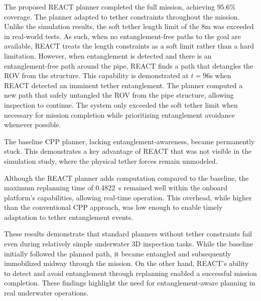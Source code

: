 The proposed \ac{REACT} planner completed the full mission, achieving $95.6\%$ coverage. The planner adapted to tether constraints throughout the mission. Unlike the simulation results, the soft tether length limit of the $8$m was exceeded in real-world tests. As such, when no entanglement-free paths to the goal are available, \ac{REACT} treats the length constraints as a soft limit rather than a hard limitation. However, when entanglement is detected and there is an entanglement-free path around the pipe, \ac{REACT} finds a path that detangles the \ac{ROV} from the structure. This capability is demonstrated at $t = 96$s when \ac{REACT} detected an imminent tether entanglement. The planner computed a new path that safely untangled the \ac{ROV} from the pipe structure, allowing inspection to continue. The system only exceeded the soft tether limit when necessary for mission completion while prioritizing entanglement avoidance whenever possible.

The baseline \ac{CPP} planner, lacking entanglement-awareness, became permanently stuck. This demonstrates a key advantage of \ac{REACT} that was not visible in the simulation study, where the physical tether forces remain unmodeled.


Although the \ac{REACT} planner adds computation compared to the baseline, the maximum replanning time of 0.4822~s remained well within the onboard platform’s capabilities, allowing real-time operation. This overhead, while higher than the conventional \ac{CPP} approach, was low enough to enable timely adaptation to tether entanglement events.


These results demonstrate that standard planners without tether constraints fail even during relatively simple underwater 3D inspection tasks. While the baseline initially followed the planned path, it became entangled and subsequently immobilized midway through the mission. On the other hand, \ac{REACT}'s ability to detect and avoid entanglement through replanning enabled a successful mission completion. These findings highlight the need for entanglement-aware planning in real underwater operations.

\begin{table}[t]
    \centering
    \caption{Coverage Performance in Real-world Trials}
    \label{tab:realworld_coverage}
    \vspace{0.5em}
\end{table}

